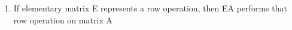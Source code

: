 \documentclass{article}
\begin{document}
\begin{enumerate}

\item If elementary matrix E represents a row operation, then EA performs 
that row operation on matrix A


\end{enumerate}
\end{document}
